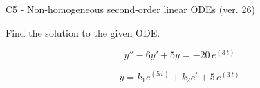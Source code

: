 \begin{exercise}
  \begin{exerciseTitle}C5 - Non-homogeneous second-order linear ODEs (ver. 26)\end{exerciseTitle}
  \begin{exerciseStatement}
    
Find the solution to the given ODE.

    
\[y''-6y'+5y = -20 \, e^{\left(3 \, t\right)}\]

  \end{exerciseStatement}
  \begin{exerciseAnswer}
    
\[y= k_{1} e^{\left(5 \, t\right)} + k_{2} e^{t} + 5 \, e^{\left(3 \, t\right)}\]

  \end{exerciseAnswer}
\end{exercise}